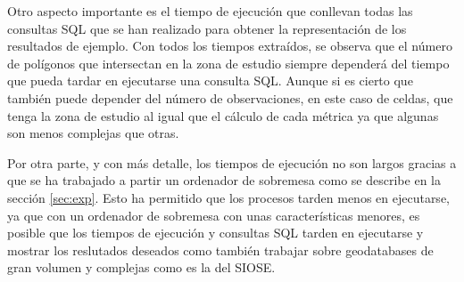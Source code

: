 Otro aspecto importante es el tiempo de ejecución que conllevan todas las consultas SQL que se han realizado para obtener la representación de los resultados de ejemplo. Con todos los tiempos extraídos, se observa que el número de polígonos que intersectan en la zona de estudio siempre dependerá del tiempo que pueda tardar en ejecutarse una consulta SQL. Aunque si es cierto que también puede depender del número de observaciones, en este caso de celdas, que tenga la zona de estudio al igual que el cálculo de cada métrica ya que algunas son menos complejas que otras. 

Por otra parte, y con más detalle, los tiempos de ejecución no son largos gracias a que se ha trabajado a partir un ordenador de sobremesa como se describe en la sección \ref{sec:exp}. Esto ha permitido que los procesos tarden menos en ejecutarse, ya que con un ordenador de sobremesa con unas características menores, es posible que los tiempos de ejecución y consultas SQL tarden en ejecutarse y mostrar los reslutados deseados como también trabajar sobre geodatabases de gran volumen y complejas como es la del SIOSE.


